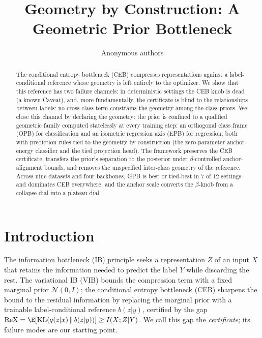 \documentclass{article} %
\title{Geometry by Construction: A Geometric Prior Bottleneck}
\author{Anonymous authors}
\theoremstyle{plain}
\theoremstyle{remark}
\renewcommand{\KL}{\operatorname{KL}}
\begin{document}
\maketitle

\begin{abstract}
The conditional entropy bottleneck (CEB) compresses representations against a
label-conditional reference whose geometry is left entirely to the optimizer. We
show that this reference has two failure channels: in deterministic settings the
CEB knob is dead (a known Caveat), and, more fundamentally, the certificate is
blind to the relationships between labels: no cross-class term constrains the
geometry among the class priors. We close this channel by declaring the geometry:
the prior is confined to a qualified geometric family computed statelessly at
every training step: an orthogonal class frame (OPB) for classification and an
isometric regression axis (EPB) for regression, both with prediction rules tied
to the geometry by construction (the zero-parameter anchor-energy classifier and
the tied projection head). The framework preserves the CEB certificate, transfers
the prior's separation to the posterior under $\beta$-controlled anchor-alignment
bounds, and removes the unspecified inter-class geometry of the reference. Across
nine datasets and four backbones, GPB is best or tied-best in $7$ of $12$ settings
and dominates CEB everywhere, and the anchor scale converts the $\beta$-knob from
a collapse dial into a plateau dial.
\end{abstract}


\section{Introduction}

The information bottleneck (IB) principle \citep{tishby2000information} seeks a
representation $Z$ of an input $X$ that retains the information needed to predict the
label $Y$ while discarding the rest. The variational IB (VIB) \citep{alemi2017deep}
bounds the compression term with a fixed marginal prior $\mathcal{N}(0,I)$; the
conditional entropy bottleneck (CEB) \citep{fischer2020conditional} sharpens the bound
to the residual information by replacing the marginal prior with a trainable
label-conditional reference $b(z|y)$, certified by the gap
$\mathrm{ReX} = \E[\KL(q(z|x)\,\|\,b(z|y))] \ge I(X;Z|Y)$. We call this gap the
\emph{certificate}; its failure modes are our starting point.
\end{document}
